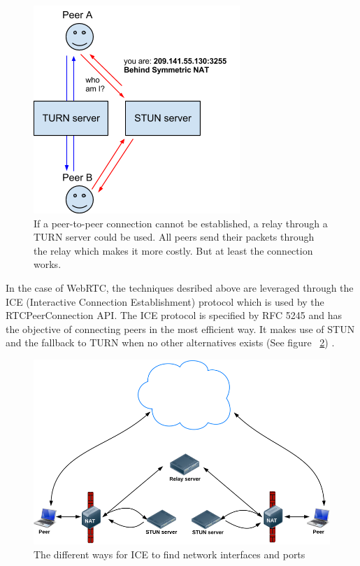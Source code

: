 \begin{figure}[htp]
\centering
\includegraphics[width=\textwidth,height=0.2\paperheight,keepaspectratio
]{figures/webrtc-turn}
\caption{If a peer-to-peer connection cannot be established, a relay through a TURN server could be used. All peers send their packets through the relay which makes it more costly. But at least the connection works\cite{WebRTCArchitecture:2014:Online}.}
\label{fig:WebRTC - TURN}
\end{figure}

In the case of WebRTC, the techniques desribed above are leveraged through the ICE (Interactive Connection Establishment) protocol which is used by the RTCPeerConnection API. The ICE protocol is specified by RFC 5245 and has the objective of connecting peers in the most efficient way. It makes use of STUN and the fallback to TURN when no other alternatives exists (See figure ~\ref{fig:ICE}) \cite{RFC5245:Online}.

\begin{figure}[htp]
\centering
\includegraphics[width=\textwidth,height=0.25\paperheight,keepaspectratio
]{figures/ICE}
\caption{The different ways for ICE to find network interfaces and ports \cite{WebRTCBasics:2012:Online}}
\label{fig:ICE}
\end{figure}

